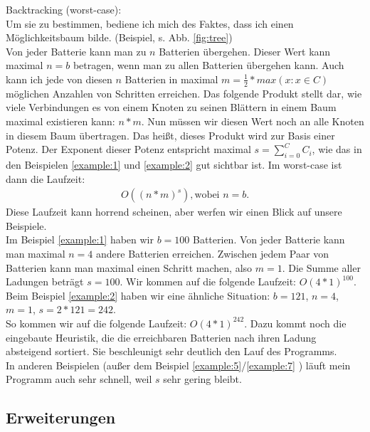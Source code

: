 \documentclass[a4paper,10pt,ngerman]{scrartcl}
\begin{document}
Backtracking (worst-case):\\
Um sie zu bestimmen, bediene ich mich des Faktes, dass ich
einen Möglichkeitsbaum bilde. (Beispiel, s. Abb. \ref{fig:tree})\\
Von jeder Batterie kann man zu $n$ Batterien übergehen.
Dieser Wert kann maximal $n = b$ betragen, wenn man zu allen Batterien übergehen kann.
Auch kann ich jede von diesen $n$ Batterien in maximal $m = \frac{1}{2}*max(x: x \in C)$
möglichen Anzahlen von Schritten erreichen.
Das folgende Produkt stellt dar, wie viele Verbindungen es von einem Knoten zu seinen Blättern in einem Baum maximal existieren kann: $n * m$.
Nun müssen wir diesen Wert noch an alle Knoten in diesem Baum übertragen. Das heißt, dieses Produkt wird zur Basis einer Potenz.
Der Exponent dieser Potenz entspricht maximal $s = \sum_{i=0}^C{C_i}$, wie das in den Beispielen \ref{example:1} und \ref{example:2} gut
sichtbar ist. Im worst-case ist dann die Laufzeit:
\begin{align*}
O((n*m)^s), \text{wobei } n = b.
\end{align*}
Diese Laufzeit kann horrend scheinen, aber werfen wir einen Blick auf unsere Beispiele.\\
Im Beispiel \ref{example:1} haben wir $b = 100$ Batterien. Von jeder Batterie kann man maximal $n = 4$ andere Batterien erreichen.
Zwischen jedem Paar von Batterien kann man maximal einen Schritt machen, also $m = 1$. Die Summe aller Ladungen beträgt $s=100$.
Wir kommen auf die folgende Laufzeit: $O(4 * 1)^{100}$.\\
Beim Beispiel \ref{example:2} haben wir eine ähnliche Situation: $b = 121$, $n = 4$, $m = 1$, $s = 2* 121 = 242$.\\
So kommen wir auf die folgende Laufzeit: $O(4 * 1)^{242}$.
Dazu kommt noch die eingebaute Heuristik, die die erreichbaren Batterien nach ihren Ladung absteigend sortiert.
Sie beschleunigt sehr deutlich den Lauf des Programms.\\
In anderen Beispielen (außer dem Beispiel \ref{example:5}/\ref{example:7} ) läuft mein Programm auch sehr schnell, weil $s$ sehr gering bleibt. 


\subsection{Erweiterungen}
\end{document}
